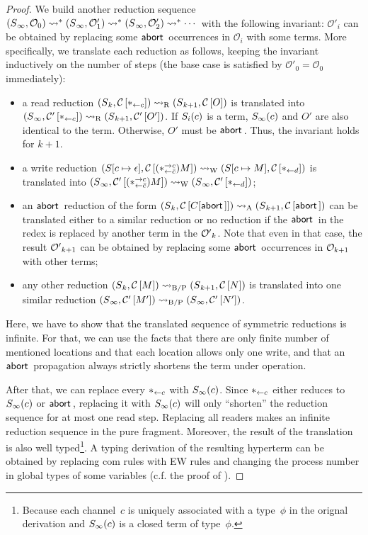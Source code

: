 \begin{proof}
We build another reduction sequence
$
({S}{_\infty},{\mathcal{O}_0})
\rightsquigarrow^\ast
({S}{_\infty},{\mathcal{O}'_1})
\rightsquigarrow^\ast
({S}{_\infty},{\mathcal{O}'_2})
\rightsquigarrow^\ast\cdots
$
with the following invariant:
$\mathcal O'_i$ can be obtained by replacing some $\mathsf{abort\,}$ occurrences
in $\mathcal O_i$ with some terms.
More specifically, we translate each reduction as follows, keeping the
invariant inductively on the number of steps
(the base case is satisfied by $\mathcal O'_0 = \mathcal O_0$ immediately):
\begin{itemize}
 \item a read reduction $({S}{_k},{{\mathcal{C}}\left[{\ast_{\leftarrow{c}}}\right]})
       \rightsquigarrow_{\mathrm R}
       ({S}{_{k+1}},{{\mathcal{C}}\left[{O}\right]})$ is translated into
       $({S}{_\infty},{{\mathcal{C}'}\left[{\ast_{\leftarrow{c}}}\right]}) \rightsquigarrow_{\mathrm R}
       ({S}{_{k+1}},{{\mathcal{C}'}\left[{O'}\right]})$.
       If ${S}_i(c)$ is a term,
       ${S}_\infty(c)$ and $O'$ are also identical to the term.
       Otherwise, $O'$ must be $\mathsf{abort\,}$.
       Thus, the invariant
       holds for $k+1$.
 \item a write reduction $({S}{[c\mapsto \epsilon]},{{\mathcal{C}}\left[{(\ast^{\rightarrow {c}}_{\leftarrow{\bar{c}}})M}\right]}) \rightsquigarrow_{\mathrm W}
	({S}{[c\mapsto M]},{{\mathcal{C}}\left[{\ast_{\leftarrow{d}}}\right]})
	$ is translated into
       $({S}{_\infty},{{\mathcal{C}'}\left[{(\ast^{\rightarrow {c}}_{\leftarrow{\bar{c}}})M}\right]}) \rightsquigarrow_{\mathrm W}
	({S}{_\infty},{{\mathcal{C}'}\left[{\ast_{\leftarrow{d}}}\right]})
	$;
 \item an $\mathsf{abort\,}$ reduction of the form
       $({S}{_k},{{\mathcal{C}}\left[{C[\mathsf{abort\,}]}\right]}) \rightsquigarrow_{\mathrm A}
       ({S}{_{k+1}},{{\mathcal{C}}\left[{\mathsf{abort\,}}\right]})$ can be translated
       either to a similar reduction or no reduction if the $\mathsf{abort\,}$ in
       the redex is replaced by another term in the ${\mathcal{O}'}_k$.
       Note that even in that case, the result ${\mathcal{O}'}_{k+1}$ can
       be obtained by replacing some $\mathsf{abort\,}$ occurrences in
       $\mathcal{O}_{k+1}$ with other terms;
 \item any other reduction $({S}{_k},{{\mathcal{C}}\left[{M}\right]}) \rightsquigarrow_{\mathrm{B/P}}
       ({S}{_{k+1}},{{\mathcal{C}}\left[{N}\right]})$
       is translated into one similar reduction
       $({S}{_\infty},{{\mathcal{C}'}\left[{M'}\right]})\rightsquigarrow_{\mathrm{B/P}}
        ({S}{_\infty},{{\mathcal{C}'}\left[{N'}\right]})$.
\end{itemize}
Here, we have to show that the translated sequence of symmetric
reductions is infinite.
For that, we can use the facts that there are only finite
number of mentioned locations and that each location allows only one
 write, and that an $\mathsf{abort\,}$ propagation always
strictly shortens the term under operation.

 After that, we can replace
 every ${\ast_{\leftarrow{c}}}$ with
 ${S}_\infty(c)$.
 Since $\ast_{\leftarrow{c}}$ either reduces to ${S}_\infty(c)$ or $\mathsf{abort\,}$,
 replacing it with ${S}_\infty(c)$ will only ``shorten'' the reduction
 sequence for at most one read step.
 Replacing all readers
 makes an infinite reduction sequence in the pure fragment.
 Moreover,
 the result of the translation is also well typed\footnote{Because each
 channel~$c$ is uniquely associated with a type~$\phi$ in the orignal
 derivation and ${S}_\infty(c)$ is a closed term of type~$\phi$.}.
 A typing derivation of the resulting hyperterm can be obtained by
 replacing com rules with EW rules and changing the process number in
 global types of some variables (c.f. the proof of ).


\end{proof}
